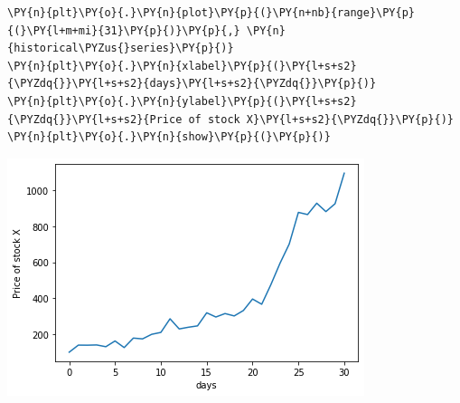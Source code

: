\begin{Answer}
\begin{codebox}[size=fbox, boxrule=1pt, colback=cellbackground, colframe=cellborder]
\begin{Verbatim}[commandchars=\\\{\}]
\PY{n}{plt}\PY{o}{.}\PY{n}{plot}\PY{p}{(}\PY{n+nb}{range}\PY{p}{(}\PY{l+m+mi}{31}\PY{p}{)}\PY{p}{,} \PY{n}{historical\PYZus{}series}\PY{p}{)}
\PY{n}{plt}\PY{o}{.}\PY{n}{xlabel}\PY{p}{(}\PY{l+s+s2}{\PYZdq{}}\PY{l+s+s2}{days}\PY{l+s+s2}{\PYZdq{}}\PY{p}{)}
\PY{n}{plt}\PY{o}{.}\PY{n}{ylabel}\PY{p}{(}\PY{l+s+s2}{\PYZdq{}}\PY{l+s+s2}{Price of stock X}\PY{l+s+s2}{\PYZdq{}}\PY{p}{)}
\PY{n}{plt}\PY{o}{.}\PY{n}{show}\PY{p}{(}\PY{p}{)}
\end{Verbatim}
\end{codebox}
\vspace{5.5cm}
\begin{center}
  \includegraphics{figures/lesson6_solutions_5_0.png}
\end{center}
\end{Answer}
